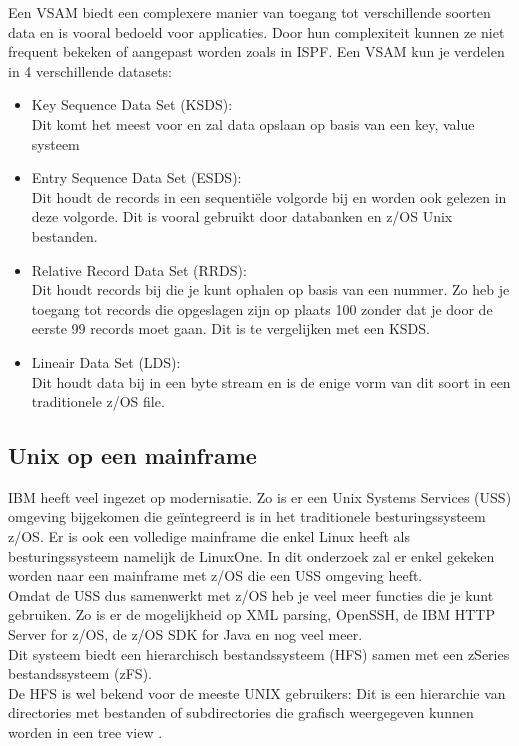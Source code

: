 Een VSAM biedt een complexere manier van toegang tot verschillende soorten data en is vooral bedoeld voor applicaties. Door hun complexiteit kunnen ze niet frequent bekeken of aangepast worden zoals in ISPF. Een VSAM kun je verdelen in 4 verschillende datasets:
\begin{itemize}
    \item Key Sequence Data Set (KSDS): \\Dit komt het meest voor en zal data opslaan op basis van een key, value systeem
    \item Entry Sequence Data Set (ESDS): \\Dit houdt de records in een sequentiële volgorde bij en worden ook gelezen in deze volgorde. Dit is vooral gebruikt door databanken en z/OS Unix bestanden.
    \item Relative Record Data Set (RRDS): \\Dit houdt records bij die je kunt ophalen op basis van een nummer. Zo heb je toegang tot records die opgeslagen zijn op plaats 100 zonder dat je door de eerste 99 records moet gaan. Dit is te vergelijken met een KSDS.
    \item Lineair Data Set (LDS): \\Dit houdt data bij in een byte stream en is de enige vorm van dit soort in een traditionele z/OS file.
\end{itemize}
\autocite{IBM}
\subsection{Unix op een mainframe}
IBM heeft veel ingezet op modernisatie. Zo is er een Unix Systems Services (USS) omgeving bijgekomen die geïntegreerd is in het traditionele besturingssysteem z/OS. Er is ook een volledige mainframe die enkel Linux heeft als besturingssysteem namelijk de LinuxOne. In dit onderzoek zal er enkel gekeken worden naar een mainframe met z/OS die een USS omgeving heeft. \\

Omdat de USS dus samenwerkt met z/OS heb je veel meer functies die je kunt gebruiken. Zo is er de mogelijkheid op XML parsing, OpenSSH, de IBM HTTP Server for z/OS, de z/OS SDK for Java en nog veel meer. \autocite{Dhawan2013} \\
 
Dit systeem biedt een hierarchisch bestandssysteem (HFS) samen met een zSeries bestandssysteem (zFS). \autocite{Precisely2020} \\ De HFS is wel bekend voor de meeste UNIX gebruikers: Dit is een hierarchie van directories met bestanden of subdirectories die grafisch weergegeven kunnen worden in een tree view \autocite{HCLTechnologies2022}. \\ 

